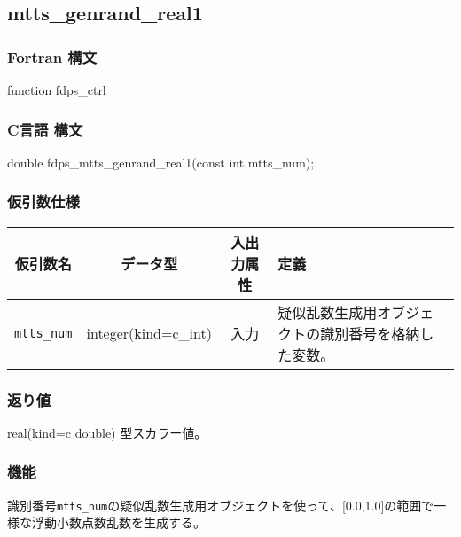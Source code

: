 \subsection{mtts\_genrand\_real1}
\subsubsection*{Fortran 構文}
\begin{screen}
\begin{spverbatim}  
function fdps_ctrl%
\end{spverbatim}
\end{screen}

\subsubsection*{C言語 構文}
\begin{screen}
\begin{spverbatim}  
double fdps_mtts_genrand_real1(const int mtts_num);
\end{spverbatim}
\end{screen}

\subsubsection*{仮引数仕様}
\begin{table}[h]
\begin{tabularx}{\linewidth}{cccX}
\toprule
\rowcolor{Snow2}
仮引数名 & データ型 & 入出力属性 & 定義 \\
\midrule
\verb|mtts_num| & integer(kind=c\_int) & 入力 & 疑似乱数生成用オブジェクトの識別番号を格納した変数。\\
\bottomrule
\end{tabularx}
\end{table}

\subsubsection*{返り値}
real(kind=c double) 型スカラー値。

\subsubsection*{機能}
識別番号\texttt{mtts\_num}の疑似乱数生成用オブジェクトを使って、[0.0,1.0]の範囲で一様な浮動小数点数乱数を生成する。
\clearpage

